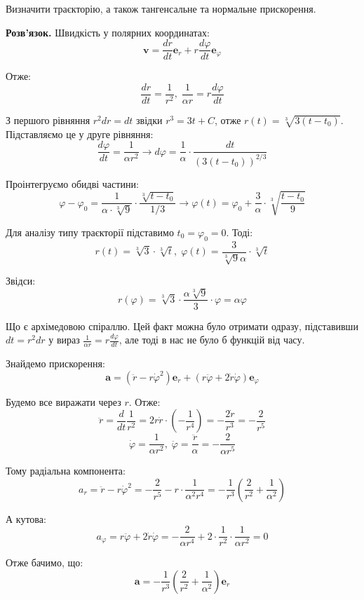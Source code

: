 \documentclass[12pt]{extarticle}
\begin{document}
Визначити траєкторію, а також тангенсальне та нормальне прискорення.

\textbf{Розв'язок.} Швидкість у полярних координатах:
\[
\boldsymbol{v} = \frac{dr}{dt} \boldsymbol{e}_r + r \frac{d\varphi}{dt} \boldsymbol{e}_{\varphi}
\]

Отже:
\[
\frac{dr}{dt} = \frac{1}{r^2}, \; \frac{1}{\alpha r} = r \frac{d \varphi}{dt}
\]

З першого рівняння $r^2dr = dt$ звідки $r^3 = 3t + C$, отже $r(t)=\sqrt[3]{3(t-t_0)}$. Підставляємо це у друге рівняння:
\[
\frac{d\varphi}{dt} = \frac{1}{\alpha r^2} \to d\varphi = \frac{1}{\alpha} \cdot \frac{dt}{(3(t-t_0))^{2/3}}
\]

Проінтегруємо обидві частини:
\[
\varphi - \varphi_0 = \frac{1}{\alpha \cdot \sqrt[3]{9}} \cdot \frac{\sqrt[3]{t-t_0}}{1/3} \to \varphi(t) = \varphi_0 + \frac{3}{\alpha} \cdot \sqrt[3]{\frac{t-t_0}{9}}
\]

Для аналізу типу траєкторії підставимо $t_0=\varphi_0=0$. Тоді:
\[
r(t) = \sqrt[3]{3} \cdot \sqrt[3]{t}, \; \varphi(t) = \frac{3}{\sqrt[3]{9}\alpha} \cdot \sqrt[3]{t}
\]

Звідси:
\[
r(\varphi) = \sqrt[3]{3} \cdot \frac{\alpha \sqrt[3]{9}}{3} \cdot \varphi = \alpha\varphi
\]

Що є архімедовою спіраллю. Цей факт можна було отримати одразу, підставивши $dt=r^2dr$ у вираз $\frac{1}{\alpha r} = r \frac{d\varphi}{dt}$, але тоді в нас не було б функцій від часу.

Знайдемо прискорення:
\[
\boldsymbol{a} = (\ddot{r} - r\dot{\varphi}^2)\boldsymbol{e}_r + (r\ddot{\varphi} + 2\dot{r}\dot{\varphi})\boldsymbol{e}_{\varphi}
\]

Будемо все виражати через $r$. Отже:
\[
\ddot{r} = \frac{d}{dt} \frac{1}{r^2} = 2r\dot{r} \cdot \left(-\frac{1}{r^4}\right) = -\frac{2\dot{r}}{r^3} = -\frac{2}{r^5}
\]
\[
\dot{\varphi} = \frac{1}{\alpha r^2}, \; \ddot{\varphi} = \frac{\ddot{r}}{\alpha} = -\frac{2}{\alpha r^5}
\]

Тому радіальна компонента:
\[
a_r = \ddot{r} - r\dot{\varphi}^2 = -\frac{2}{r^5} - r \cdot \frac{1}{\alpha^2r^4} = -\frac{1}{r^3}\left(\frac{2}{r^2} + \frac{1}{\alpha^2}\right)
\]

А кутова:
\[
a_{\varphi} = r\ddot{\varphi} + 2\dot{r}\dot{\varphi} = -\frac{2}{\alpha r^4} + 2 \cdot \frac{1}{r^2} \cdot \frac{1}{\alpha r^2} = 0
\]

Отже бачимо, що:
\[
\boldsymbol{a} = -\frac{1}{r^3}\left(\frac{2}{r^2} + \frac{1}{\alpha^2}\right)\boldsymbol{e}_r
\]
\end{document}
